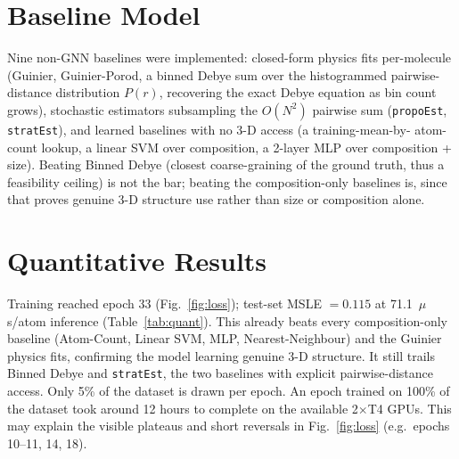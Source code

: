\documentclass[final]{article}
\begin{document}
\section{Baseline Model}
Nine non-GNN baselines were implemented: closed-form physics fits per-molecule
(Guinier, Guinier-Porod, a binned Debye sum over the histogrammed pairwise-distance
distribution $P(r)$, recovering the exact Debye equation as bin count grows),
stochastic estimators subsampling the $O(N^2)$ pairwise sum (\texttt{propoEst},
\texttt{stratEst}), and learned baselines with no 3-D access (a training-mean-by-
atom-count lookup, a linear SVM over composition, a 2-layer MLP over composition +
size). Beating Binned Debye (closest coarse-graining of the ground truth, thus a
feasibility ceiling) is not the bar; beating the composition-only baselines is, since
that proves genuine 3-D structure use rather than size or composition alone.

\section{Quantitative Results}
Training reached epoch 33 (Fig.~\ref{fig:loss}); test-set MSLE $= 0.115$ at
71.1~$\mu$s/atom inference (Table~\ref{tab:quant}). This already beats every
composition-only baseline (Atom-Count, Linear SVM, MLP, Nearest-Neighbour) and the
Guinier physics fits, confirming the model learning genuine 3-D structure. It
still trails Binned Debye and \texttt{stratEst}, the two baselines with explicit
pairwise-distance access. Only 5\% of the dataset is drawn per epoch. An epoch trained
on 100\% of the dataset took around 12 hours to complete on the available 2$\times$T4 GPUs.
This may explain the visible plateaus and short 
reversals in Fig.~\ref{fig:loss} (e.g.\ epochs 10--11, 14, 18).
\end{document}
